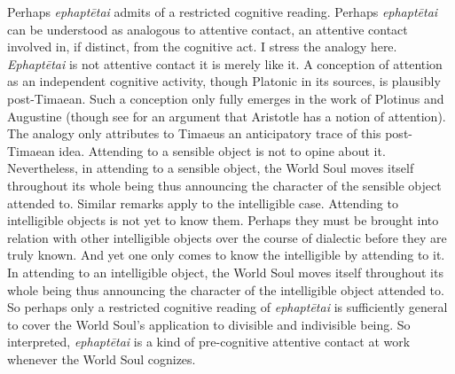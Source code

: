 Perhaps \emph{ephaptētai} admits of a restricted cognitive reading. Perhaps \emph{ephaptētai} can be understood as analogous to attentive contact, an attentive contact involved in, if distinct, from the cognitive act. I stress the analogy here. \emph{Ephaptētai} is not attentive contact it is merely like it. A conception of attention as an independent cognitive activity, though Platonic in its sources, is plausibly post-Timaean. Such a conception only fully emerges in the work of Plotinus and Augustine (though see \citealt{FiecconiForthcoming-FIEAOA} for an argument that Aristotle has a notion of attention). The analogy only attributes to Timaeus an anticipatory trace of this post-Timaean idea. Attending to a sensible object is not to opine about it. Nevertheless, in attending to a sensible object, the World Soul moves itself throughout its whole being thus announcing the character of the sensible object attended to. Similar remarks apply to the intelligible case. Attending to intelligible objects is not yet to know them. Perhaps they must be brought into relation with other intelligible objects over the course of dialectic before they are truly known. And yet one only comes to know the intelligible by attending to it. In attending to an intelligible object, the World Soul moves itself throughout its whole being thus announcing the character of the intelligible object attended to. So perhaps only a restricted cognitive reading of \emph{ephaptētai} is sufficiently general to cover the World Soul's application to divisible and indivisible being. So interpreted, \emph{ephaptētai} is a kind of pre-cognitive attentive contact at work whenever the World Soul cognizes.

